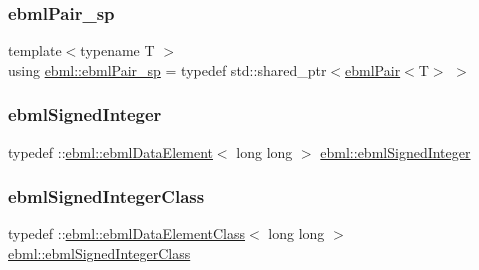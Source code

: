 \mbox{\label{namespaceebml_a15439f6031c0f4ced33b9ab5e28af120}} 
\subsubsection{\texorpdfstring{ebml\+Pair\+\_\+sp}{ebmlPair\_sp}}
{\footnotesize\ttfamily template$<$typename T $>$ \\
using \mbox{\hyperlink{namespaceebml_a15439f6031c0f4ced33b9ab5e28af120}{ebml\+::ebml\+Pair\+\_\+sp}} = typedef std\+::shared\+\_\+ptr$<$\mbox{\hyperlink{classebml_1_1ebmlPair}{ebml\+Pair}}$<$T$>$ $>$}

\mbox{\label{namespaceebml_a5429f4885c9e4e9eeda85b245ea6166a}} 
\subsubsection{\texorpdfstring{ebml\+Signed\+Integer}{ebmlSignedInteger}}
{\footnotesize\ttfamily typedef \+::\mbox{\hyperlink{classebml_1_1ebmlDataElement}{ebml\+::ebml\+Data\+Element}}$<$ long long $>$ \mbox{\hyperlink{namespaceebml_a5429f4885c9e4e9eeda85b245ea6166a}{ebml\+::ebml\+Signed\+Integer}}}

\mbox{\label{namespaceebml_a344220b1a75e640887ea0d280f2349af}} 
\subsubsection{\texorpdfstring{ebml\+Signed\+Integer\+Class}{ebmlSignedIntegerClass}}
{\footnotesize\ttfamily typedef \+::\mbox{\hyperlink{classebml_1_1ebmlDataElementClass}{ebml\+::ebml\+Data\+Element\+Class}}$<$ long long $>$ \mbox{\hyperlink{namespaceebml_a344220b1a75e640887ea0d280f2349af}{ebml\+::ebml\+Signed\+Integer\+Class}}}

\mbox{\label{namespaceebml_abd9662588801df32dd1d2853a9f2f9b1}} 
